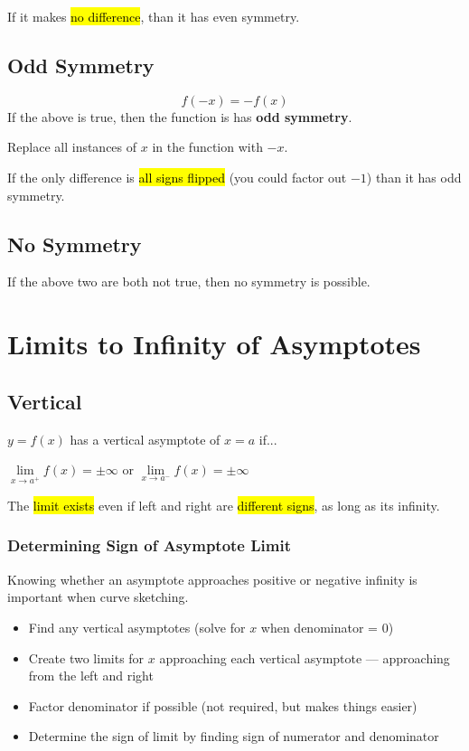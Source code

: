 \documentclass[a4paper,12pt]{article}
\begin{document}
If it makes \hl{no difference}, than it has even symmetry.

\subsection{Odd Symmetry}
$$f(-x) = -f(x)$$
If the above is true, then the function is has \textbf{odd symmetry}.

Replace all instances of $x$ in the function with $-x$. 

If the only difference is \hl{all signs flipped} (you could factor out $-1$) than it has odd symmetry.

\subsection{No Symmetry}
If the above two are both not true, then no symmetry is possible.

\pagebreak

\section{Limits to Infinity of Asymptotes}
\subsection{Vertical}
$y = f(x)$ has a vertical asymptote of $x = a$ if...

\begin{center}
$\lim\limits_{x \to a^+} f(x) = \pm\infty$ \;\;\;or\;\;\; $\lim\limits_{x \to a^-} f(x) = \pm\infty$
\end{center}

The \hl{limit exists} even if left and right are \hl{different signs}, as long as its infinity.

\subsubsection{Determining Sign of Asymptote Limit}
Knowing whether an asymptote approaches positive or negative infinity is important when curve sketching.

\begin{itemize}
    \item{Find any vertical asymptotes (solve for $x$ when denominator = 0)}
    \item{Create two limits for $x$ approaching each vertical asymptote --- approaching from the left and right}
    \item{Factor denominator if possible (not required, but makes things easier)}
    \item{Determine the sign of limit by finding sign of numerator and denominator}
\end{itemize}
\end{document}

